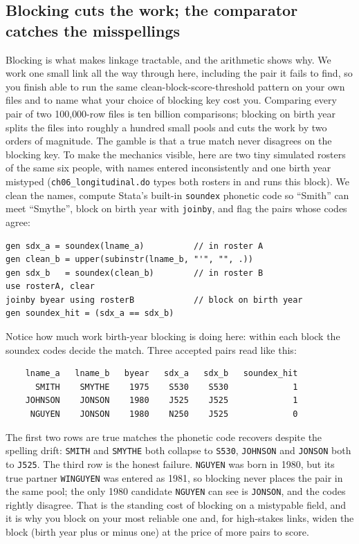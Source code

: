 \documentclass[
    a4paper,
    fontsize=10pt,
    twoside=true,
    numbers=noenddot,
]{kaobook}
\begin{document}
\subsection{Blocking cuts the work; the comparator catches the misspellings}\label{sec:ch06-blocking}
Blocking is what makes linkage tractable, and the arithmetic shows why. We work one small link all the way through here, including the pair it fails to find, so you finish able to run the same clean-block-score-threshold pattern on your own files and to name what your choice of blocking key cost you. Comparing every pair of two 100{,}000-row files is ten billion comparisons; blocking on birth year splits the files into roughly a hundred small pools and cuts the work by two orders of magnitude. The gamble is that a true match never disagrees on the blocking key. To make the mechanics visible, here are two tiny simulated rosters of the same six people, with names entered inconsistently and one birth year mistyped (\texttt{ch06\_longitudinal.do} types both rosters in and runs this block). We clean the names, compute Stata's built-in \texttt{soundex} phonetic code so \enquote{Smith} can meet \enquote{Smythe}, block on birth year with \texttt{joinby}, and flag the pairs whose codes agree:
\par
{\footnotesize
\begin{verbatim}
gen sdx_a = soundex(lname_a)          // in roster A
gen clean_b = upper(subinstr(lname_b, "'", "", .))
gen sdx_b   = soundex(clean_b)        // in roster B
use rosterA, clear
joinby byear using rosterB            // block on birth year
gen soundex_hit = (sdx_a == sdx_b)
\end{verbatim}
}
Notice how much work birth-year blocking is doing here: within each block the soundex codes decide the match. Three accepted pairs read like this:
\par
{\footnotesize
\begin{verbatim}
    lname_a   lname_b   byear   sdx_a   sdx_b   soundex_hit
      SMITH    SMYTHE    1975    S530    S530             1
    JOHNSON    JONSON    1980    J525    J525             1
     NGUYEN    JONSON    1980    N250    J525             0
\end{verbatim}
}
The first two rows are true matches the phonetic code recovers despite the spelling drift: \texttt{SMITH} and \texttt{SMYTHE} both collapse to \texttt{S530}, \texttt{JOHNSON} and \texttt{JONSON} both to \texttt{J525}. The third row is the honest failure. \texttt{NGUYEN} was born in 1980, but its true partner \texttt{WINGUYEN} was entered as 1981, so blocking never places the pair in the same pool; the only 1980 candidate \texttt{NGUYEN} can see is \texttt{JONSON}, and the codes rightly disagree. That is the standing cost of blocking on a mistypable field, and it is why you block on your most reliable one and, for high-stakes links, widen the block (birth year plus or minus one) at the price of more pairs to score.
\end{document}
